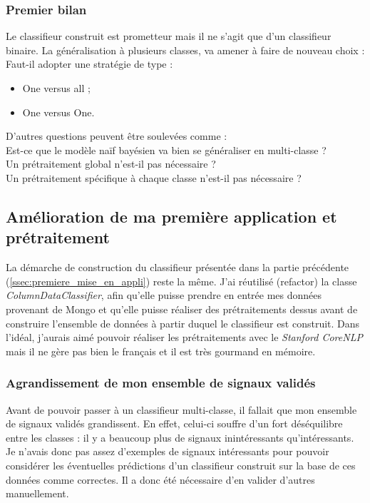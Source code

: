             \subsubsection{Premier bilan}
                Le classifieur construit est prometteur mais il ne s'agit que d'un classifieur binaire. La généralisation à plusieurs classes, va amener à faire de nouveau choix :\\
                Faut-il adopter une stratégie de type :
                \begin{itemize}
                    \item One versus all ;
                    \item One versus One.
                \end{itemize}
                D'autres questions peuvent être soulevées comme :\\
                Est-ce que le modèle naïf bayésien va bien se généraliser en multi-classe ?\\
                Un prétraitement global n'est-il pas nécessaire ?\\
                Un prétraitement spécifique à chaque classe n'est-il pas nécessaire ?\\

        \subsection{Amélioration de ma première application et prétraitement}
            La démarche de construction du classifieur présentée dans la partie précédente (\ref{ssec:premiere_mise_en_appli}) reste la même. J'ai réutilisé (refactor) la classe \textit{ColumnDataClassifier}, afin qu'elle puisse prendre en entrée mes données provenant de Mongo et qu'elle puisse réaliser des prétraitements dessus avant de construire l'ensemble de données à partir duquel le classifieur est construit. Dans l'idéal, j'aurais aimé pouvoir réaliser les prétraitements avec le \textit{Stanford CoreNLP} mais il ne gère pas bien le français et il est très gourmand en mémoire.
            \subsubsection{Agrandissement de mon ensemble de signaux validés}
                Avant de pouvoir passer à un classifieur multi-classe, il fallait que mon ensemble de signaux validés grandissent. En effet, celui-ci souffre d'un fort déséquilibre entre les classes : il y a beaucoup plus de signaux inintéressants qu'intéressants. Je n'avais donc pas assez d'exemples de signaux intéressants pour pouvoir considérer les éventuelles prédictions d'un classifieur construit sur la base de ces données comme correctes. Il a donc été nécessaire d'en valider d'autres manuellement.


